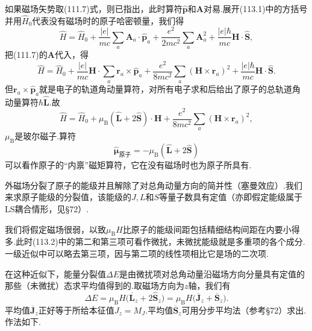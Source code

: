 如果磁场矢势取(111.7)式，则已指出，此时算符$\hat{\boldsymbol{p}}$和$\boldsymbol{A}$对易.展开(113.1)中的方括号并用$\hat{H}_0$代表没有磁场时的原子哈密顿量，我们得
\begin{equation*}
  \hat{H}=\hat{H}_0+\frac{|e|}{mc}\sum_a\boldsymbol{A}_a\cdot\hat{\boldsymbol{p}}_a
  +\frac{e^2}{2mc^2}\sum_a\boldsymbol{A}_a^2
  +\frac{|e|\hbar}{mc}\boldsymbol{H}\cdot\hat{\boldsymbol{S}},
\end{equation*}
把(111.7)的$\boldsymbol{A}$代入，得
\begin{equation*}
  \hat{H}=\hat{H}_0+\frac{|e|}{mc}\boldsymbol{H}\cdot\sum_a\boldsymbol{r}_a\times\hat{\boldsymbol{p}}_a
  +\frac{e^2}{8mc^2}\sum_a(\boldsymbol{H}\times\boldsymbol{r}_a)^2
  +\frac{|e|\hbar}{mc}\boldsymbol{H}\cdot\hat{\boldsymbol{S}}.
\end{equation*}
但$\boldsymbol{r}_a\times\hat{\boldsymbol{p}}_a$就是电子的轨道角动量算符，对所有电子求和后给出了原子的总轨道角动量算符$\hbar\hat{\boldsymbol{L}}$.故
\begin{equation}
  \hat{H}=\hat{H}_0+\mu_\mathrm{B}(\hat{\boldsymbol{L}}+2\hat{\boldsymbol{S}})\cdot\boldsymbol{H}
  +\frac{e^2}{8mc^2}\sum_a(\boldsymbol{H}\times\boldsymbol{r}_a)^2,
\end{equation}
$\mu_\mathrm{B}$是玻尔磁子.算符
\begin{equation}
  \hat{\boldsymbol{\mu}}_{\text{原子}}=-\mu_\mathrm{B}(\hat{\boldsymbol{L}}+2\hat{\boldsymbol{S}})
\end{equation}
可以看作原子的“内禀”磁矩算符，它在没有磁场时也为原子所具有.

外磁场分裂了原子的能级并且解除了对总角动量方向的简并性（塞曼效应）.我们来求原子能级的分裂值，该能级的$J,L$和$S$等量子数具有定值（亦即假定能级属于LS耦合情形，见§72）.

我们将假定磁场很弱，以致$\mu_\mathrm{B}H$比原子的能级间距包括精细结构间距在内要小得多.此时(113.2)中的第二和第三项可看作微扰，未微扰能级就是多重项的各个成分.一级近似中可以略去第三项，因与第二项的线性项相比它是场的二次项.

在这种近似下，能量分裂值$\Delta E$是由微扰项对总角动量沿磁场方向分量具有定值的那些（未微扰）态求平均值得到的.取磁场方向为$z$轴，我们有
\begin{equation}
  \Delta E=\mu_\mathrm{B}H\bigl(\overline{\boldsymbol{L}}_z+2\hat{\boldsymbol{S}}_z\bigr)
  =\mu_\mathrm{B}H\bigl(\overline{\boldsymbol{J}}_z+\overline{\boldsymbol{S}}_z\bigr).
\end{equation}
平均值$\overline{\boldsymbol{J}}_z$正好等于所给本征值$J_z=M_J$.平均值$\overline{\boldsymbol{S}}_z$可用分步平均法（参考§72）求出.作法如下.

